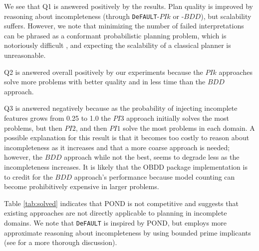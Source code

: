 \documentclass{article}
\def\citep#1{\cite{#1}} \def\citet#1{\citeA{#1}}
\def\FFRISKY{{\tt DeFAULT}}
\begin{document}
We see that Q1 is answered positively by the results.  Plan quality is
improved by reasoning about incompleteness (through \FFRISKY{}-$PIk$ or -$BDD$),
but scalability suffers.  However, we note that minimizing the number of failed
interpretations  can be phrased as a conformant probabilistic
planning problem, which is notoriously difficult \citep{pff,aij-mclug}, and
expecting the scalability of a classical planner is  unreasonable.

Q2 is answered overall positively by our experiments because the $PIk$
approaches solve more problems with better quality and in less time than the
$BDD$ approach.  

Q3 is answered negatively because as the probability of injecting incomplete
features grows from 0.25 to 1.0 the $PI3$ approach initially solves the most
problems, but then $PI2$, and then $PI1$ solve the most problems in each domain.
A possible explanation for this result is that it becomes too costly to reason
about incompleteness as it increases and that a more coarse approach is needed;
however, the $BDD$ approach while not the best, seems to degrade less as the
incompleteness increases.  It is likely that the OBDD package \citep{jdd}
implementation is to credit for the $BDD$ approach's performance because model
counting can become prohibitively expensive in larger problems.

Table \ref{tab:solved} indicates that POND is not competitive and suggests that
existing approaches are not directly applicable to planning in incomplete
domains.  We note that \FFRISKY{} is inspired by POND, but employs more
approximate reasoning about incompleteness by using bounded prime implicants
(see \citep{USU-CS-TR-11-001} for a more thorough discussion).

\end{document}
